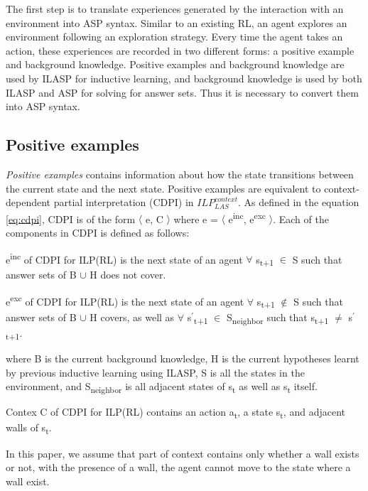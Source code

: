 The first step is to translate experiences generated by the interaction with an environment into ASP syntax. 
Similar to an existing RL, an agent explores an environment following an exploration strategy.
Every time the agent takes an action, these experiences are recorded in two different forms: 
a positive example and background knowledge. 
Positive examples and background knowledge are used by ILASP for inductive learning, and background knowledge is used by both ILASP and ASP for solving for answer sets.
Thus it is necessary to convert them into ASP syntax.

\subsection{Positive examples}
\textit{Positive examples} contains information about how the state transitions between the current state and the next state.
Positive examples are equivalent to context-dependent partial interpretation (CDPI) in  $ILP_{LAS}^{context}$. 
As defined in the equation \ref{eq:cdpi}, CDPI is of the form $\langle$ e, C $\rangle$ where e = $\langle$ e\textsuperscript{inc}, e\textsuperscript{exc} $\rangle$. 
Each of the components in CDPI is defined as follows:
\begin{defn}
e\textsuperscript{inc} of CDPI for ILP(RL) is the next state of an agent $\forall$ s\textsubscript{t+1} $\in$ S such that answer sets of B $\cup$ H does not cover.
\end{defn}

\begin{defn}
e\textsuperscript{exc} of CDPI for ILP(RL) is the next state of an agent $\forall$ s\textsubscript{t+1} $\not\in$ S such that answer sets of B $\cup$ H covers,
as well as $\forall$ s$^\prime$\textsubscript{t+1} $\in$ S\textsubscript{neighbor} such that s\textsubscript{t+1} $\neq$ s$^\prime$\textsubscript{t+1}.
\end{defn}
where B is the current background knowledge, H is the current hypotheses learnt by previous inductive learning using ILASP, S is all the states in the environment, and S\textsubscript{neighbor} is all adjacent states of s\textsubscript{t} as well as s\textsubscript{t} itself.

\begin{defn}
Contex C of CDPI for ILP(RL) contains an action a\textsubscript{t}, a state s\textsubscript{t}, and adjacent walls of s\textsubscript{t}.
\end{defn}

In this paper, we assume that part of context contains only whether a wall exists or not, with the presence of a wall, the agent cannot move to the state where a wall exist.

